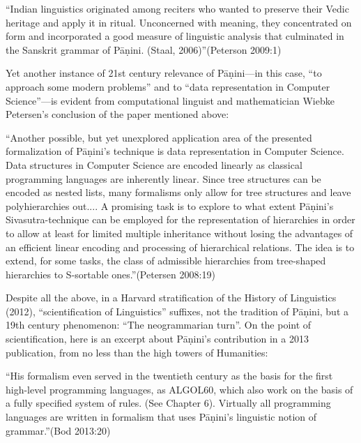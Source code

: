 \begin{myquote}
“Indian linguistics originated among reciters who wanted to preserve their Vedic heritage and apply it in ritual. Unconcerned with meaning, they concentrated on form and incorporated a good measure of linguistic analysis that culminated in the Sanskrit grammar of Pāṇini. (Staal, 2006)”\hfill (Peterson 2009:1)
\end{myquote}

Yet another instance of 21st century relevance of Pāṇini—in this case, “to approach some modern problems” and to “data representation in Computer Science”—is evident from computational linguist and mathematician Wiebke Petersen’s conclusion of the paper mentioned above:

\begin{myquote}
“Another possible, but yet unexplored application area of the presented formalization of Pāṇini’s technique is data representation in Computer Science. Data structures in Computer Science are encoded linearly as classical programming languages are inherently linear. Since tree structures can be encoded as nested lists, many formalisms only allow for tree structures and leave polyhierarchies out.... A promising task is to explore to what extent Pāṇini’s Sivasutra-technique can be employed for the representation of hierarchies in order to allow at least for limited multiple inheritance without losing the advantages of an efficient linear encoding and processing of hierarchical relations. The idea is to extend, for some tasks, the class of admissible hierarchies from tree-shaped hierarchies to S-sortable ones.”\hfill (Petersen 2008:19)
\end{myquote}

Despite all the above, in a Harvard stratification of the History of Linguistics (2012), “scientification of Linguistics” suffixes, not the tradition of Pāṇini, but a 19th century phenomenon: “The neogrammarian turn”. On the point of scientification, here is an excerpt about Pāṇini’s contribution in a 2013 publication, from no less than the high towers of Humanities:

\begin{myquote}
“His formalism even served in the twentieth century as the basis for the first high-level programming languages, as ALGOL60, which also work on the basis of a fully specified system of rules. (See Chapter 6). Virtually all programming languages are written in formalism that uses Pāṇini’s linguistic notion of grammar.”\hfill (Bod 2013:20)
\end{myquote}


